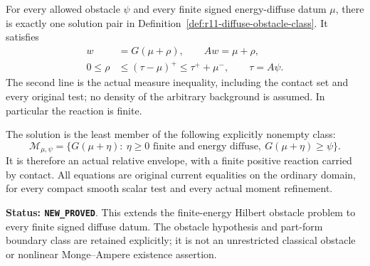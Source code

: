 \begin{theorem}
\label{thm:r11-diffuse-obstacle-contact}
For every allowed obstacle $\psi$ and every finite signed
energy-diffuse datum $\mu$, there is exactly one solution pair in
Definition~\ref{def:r11-diffuse-obstacle-class}.  It satisfies
\[
 \begin{split}
 w&=G(\mu+\rho),\qquad Aw=\mu+\rho,\\
 0\le\rho&\le(\tau-\mu)^+\le\tau^++\mu^-,\qquad \tau=A\psi.
 \end{split}
 \tag{OB8}
\]
The second line is the actual measure inequality, including the
contact set and every original test; no density of the arbitrary
background is assumed.  In particular the reaction is finite.

The solution is the least member of the following explicitly
nonempty class:
\[
 \mathscr M_{\mu,\psi}=
 \{G(\mu+\eta):\ \eta\ge0\text{ finite and energy diffuse},\
                         G(\mu+\eta)\ge\psi\}.
 \tag{OB9}
\]
It is therefore an actual relative envelope, with a finite positive
reaction carried by contact.  All equations are original current
equalities on the ordinary domain, for every compact smooth scalar
test and every actual moment refinement.
\end{theorem}

\noindent\textbf{Status: \texttt{NEW\_PROVED}}.  This extends the
finite-energy Hilbert obstacle problem to every finite signed diffuse
datum.  The obstacle hypothesis and part-form boundary class are
retained explicitly; it is not an unrestricted classical obstacle or
nonlinear Monge--Ampere existence assertion.

